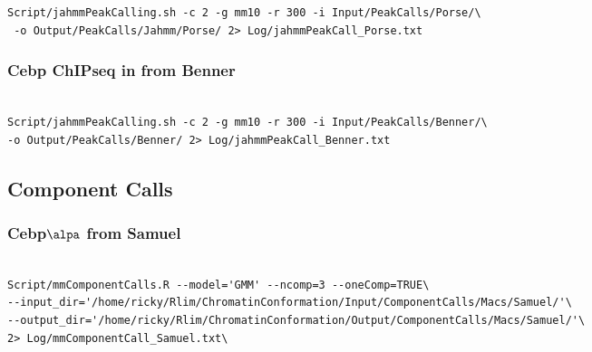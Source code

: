 \documentclass{article}\usepackage[]{graphicx}\usepackage[]{color}
\begin{document}
\begin{verbatim}
Script/jahmmPeakCalling.sh -c 2 -g mm10 -r 300 -i Input/PeakCalls/Porse/\ 
 -o Output/PeakCalls/Jahmm/Porse/ 2> Log/jahmmPeakCall_Porse.txt
\end{verbatim}

\subsubsection{Cebp ChIPseq in from Benner}
\begin{verbatim}

Script/jahmmPeakCalling.sh -c 2 -g mm10 -r 300 -i Input/PeakCalls/Benner/\ 
-o Output/PeakCalls/Benner/ 2> Log/jahmmPeakCall_Benner.txt
\end{verbatim}


\subsection{Component Calls}


\subsubsection{Cebp$\alpa$ from Samuel}
\begin{verbatim}

Script/mmComponentCalls.R --model='GMM' --ncomp=3 --oneComp=TRUE\ 
--input_dir='/home/ricky/Rlim/ChromatinConformation/Input/ComponentCalls/Macs/Samuel/'\ 
--output_dir='/home/ricky/Rlim/ChromatinConformation/Output/ComponentCalls/Macs/Samuel/'\ 
2> Log/mmComponentCall_Samuel.txt\

\end{verbatim}
\end{document}
